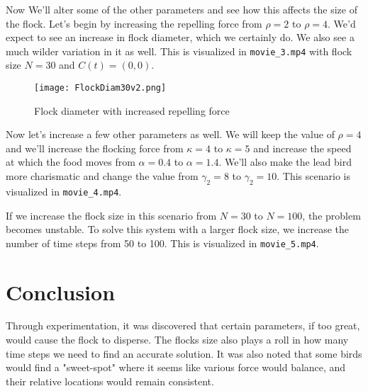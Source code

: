 \documentclass[12pt]{article}
\begin{document}
Now We'll alter some of the other parameters and see how this affects the size of the flock.
Let's begin by increasing the repelling force from $\rho = 2$ to $\rho = 4$. We'd expect to see an increase in flock diameter, which we certainly do. We also see a much wilder variation in it as well. This is visualized in \texttt{movie\_3.mp4} with flock size $N = 30$ and $C(t) = (0,0)$.

\begin{figure}[h]
    \centering
    \texttt{[image: FlockDiam30v2.png]}
    \caption{Flock diameter with increased repelling force}
\end{figure}

Now let's increase a few other parameters as well. We will keep the value of $\rho = 4$ and we'll increase the flocking force from $\kappa = 4$ to $\kappa = 5$ and increase the speed at which the food moves from $\alpha = 0.4$ to $\alpha = 1.4$. We'll also make the lead bird more charismatic and change the value from $\gamma_2 = 8$ to $\gamma_2 = 10$. This scenario is visualized in \texttt{movie\_4.mp4}.

If we increase the flock size in this scenario from $N = 30$ to $N = 100$, the problem becomes unstable. To solve this system with a larger flock size, we increase the number of time steps from 50 to 100. This is visualized in \texttt{movie\_5.mp4}.

\section{Conclusion}
Through experimentation, it was discovered that certain parameters, if too great, would cause the flock to disperse. The flocks size also plays a roll in how many time steps we need to find an accurate solution. It was also noted that some birds would find a "sweet-spot" where it seems like various force would balance, and their relative locations would remain consistent.
\end{document}
